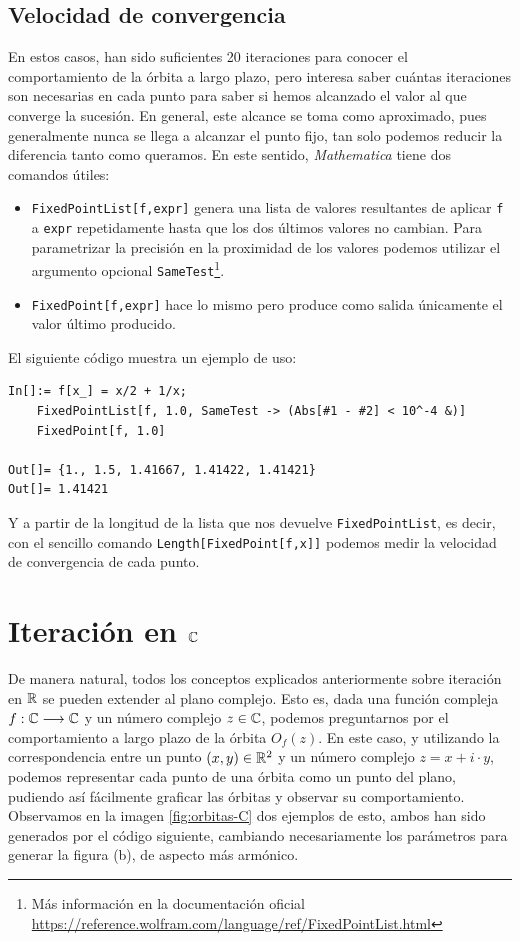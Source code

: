 \subsection{Velocidad de convergencia}

En estos casos, han sido suficientes 20 iteraciones para conocer el comportamiento de la órbita a largo plazo, pero interesa saber cuántas iteraciones son necesarias en cada punto para saber si hemos alcanzado el valor al que converge la sucesión. En general, este alcance se toma como aproximado, pues generalmente nunca se llega a alcanzar el punto fijo, tan solo podemos reducir la diferencia tanto como queramos. En este sentido, \textit{Mathematica} tiene dos comandos útiles:

\begin{itemize}
    \item \verb|FixedPointList[f,expr]| genera una lista de valores resultantes de aplicar \verb|f| a \verb|expr| repetidamente hasta que los dos últimos valores no cambian. Para parametrizar la precisión en la proximidad de los valores podemos utilizar el argumento opcional \verb|SameTest|\footnote{Más información en la documentación oficial \url{https://reference.wolfram.com/language/ref/FixedPointList.html}}.
    \item \verb|FixedPoint[f,expr]| hace lo mismo pero produce como salida únicamente el valor último producido.
\end{itemize}

El siguiente código muestra un ejemplo de uso:

\begin{verbatim}
In[]:= f[x_] = x/2 + 1/x;
    FixedPointList[f, 1.0, SameTest -> (Abs[#1 - #2] < 10^-4 &)]
    FixedPoint[f, 1.0]

Out[]= {1., 1.5, 1.41667, 1.41422, 1.41421}
Out[]= 1.41421
\end{verbatim}

Y a partir de la longitud de la lista que nos devuelve \verb|FixedPointList|, es decir, con el sencillo comando \verb|Length[FixedPoint[f,x]]| podemos medir la velocidad de convergencia de cada punto.

\section{Iteración en $\mathbb{C}$}

De manera natural, todos los conceptos explicados anteriormente sobre iteración en $\mathbb{R}$ se pueden extender al plano complejo. Esto es, dada una función compleja $f:\mathbb{C}\longrightarrow\mathbb{C}$ y un número complejo $z\in\mathbb{C}$, podemos preguntarnos por el comportamiento a largo plazo de la órbita $O_f(z)$. En este caso, y utilizando la correspondencia entre un punto $(x,y)\in\mathbb{R}^2$ y un número complejo $z=x+i\cdot y$, podemos representar cada punto de una órbita como un punto del plano, pudiendo así fácilmente graficar las órbitas y observar su comportamiento. Observamos en la imagen \ref{fig:orbitas-C} dos ejemplos de esto, ambos han sido generados por el código siguiente, cambiando necesariamente los parámetros para generar la figura (b), de aspecto más armónico.

